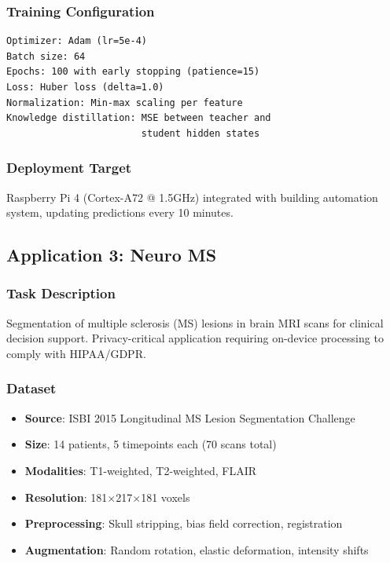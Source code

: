 \subsubsection{Training Configuration}
\begin{verbatim}
Optimizer: Adam (lr=5e-4)
Batch size: 64
Epochs: 100 with early stopping (patience=15)
Loss: Huber loss (delta=1.0)
Normalization: Min-max scaling per feature
Knowledge distillation: MSE between teacher and
                        student hidden states
\end{verbatim}

\subsubsection{Deployment Target}
Raspberry Pi 4 (Cortex-A72 @ 1.5GHz) integrated with building automation system, updating predictions every 10 minutes.

\subsection{Application 3: Neuro MS}

\subsubsection{Task Description}
Segmentation of multiple sclerosis (MS) lesions in brain MRI scans for clinical decision support. Privacy-critical application requiring on-device processing to comply with HIPAA/GDPR.

\subsubsection{Dataset}
\begin{itemize}
\item \textbf{Source}: ISBI 2015 Longitudinal MS Lesion Segmentation Challenge
\item \textbf{Size}: 14 patients, 5 timepoints each (70 scans total)
\item \textbf{Modalities}: T1-weighted, T2-weighted, FLAIR
\item \textbf{Resolution}: 181$\times$217$\times$181 voxels
\item \textbf{Preprocessing}: Skull stripping, bias field correction, registration
\item \textbf{Augmentation}: Random rotation, elastic deformation, intensity shifts
\end{itemize}

